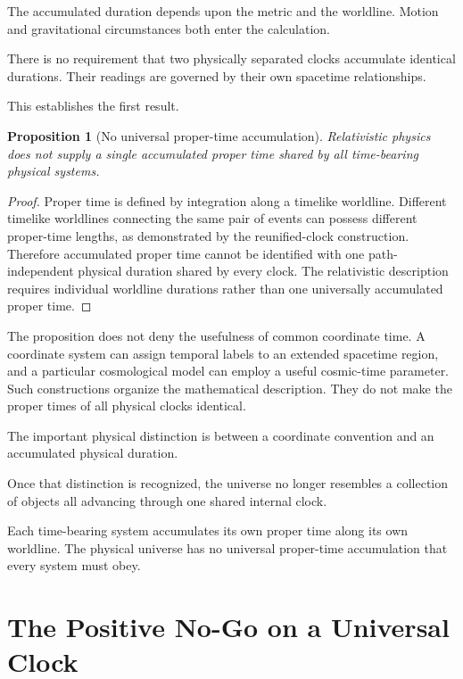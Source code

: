 \documentclass[12pt,onecolumn]{article}
\newtheorem{proposition}{Proposition}[section]
\begin{document}
The accumulated duration depends upon the metric and the worldline. Motion and gravitational circumstances both enter the calculation.

There is no requirement that two physically separated clocks accumulate identical durations. Their readings are governed by their own spacetime relationships.

This establishes the first result.

\begin{proposition}[No universal proper-time accumulation]

Relativistic physics does not supply a single accumulated proper time shared by all time-bearing physical systems.

\end{proposition}

\begin{proof}

Proper time is defined by integration along a timelike worldline. Different timelike worldlines connecting the same pair of events can possess different proper-time lengths, as demonstrated by the reunified-clock construction. Therefore accumulated proper time cannot be identified with one path-independent physical duration shared by every clock. The relativistic description requires individual worldline durations rather than one universally accumulated proper time.

\end{proof}

The proposition does not deny the usefulness of common coordinate time. A coordinate system can assign temporal labels to an extended spacetime region, and a particular cosmological model can employ a useful cosmic-time parameter. Such constructions organize the mathematical description. They do not make the proper times of all physical clocks identical.

The important physical distinction is between a coordinate convention and an accumulated physical duration.

Once that distinction is recognized, the universe no longer resembles a collection of objects all advancing through one shared internal clock.

Each time-bearing system accumulates its own proper time along its own worldline. The physical universe has no universal proper-time accumulation that every system must obey.

\section{The Positive No-Go on a Universal Clock}
\end{document}
